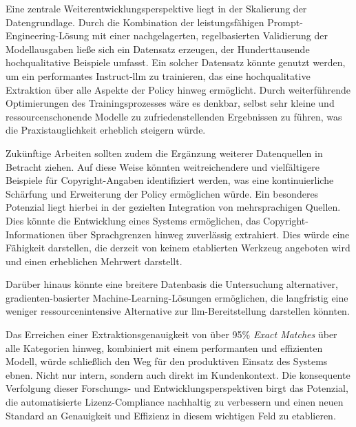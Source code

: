 Eine zentrale Weiterentwicklungsperspektive liegt in der Skalierung der Datengrundlage.
Durch die Kombination der leistungsfähigen Prompt-Engineering-Lösung mit einer nachgelagerten, regelbasierten Validierung der Modellausgaben ließe sich ein Datensatz erzeugen, der Hunderttausende hochqualitative Beispiele umfasst.
Ein solcher Datensatz könnte genutzt werden, um ein performantes Instruct-\gls{llm} zu trainieren, das eine hochqualitative Extraktion über alle Aspekte der Policy hinweg ermöglicht.
Durch weiterführende Optimierungen des Trainingsprozesses wäre es denkbar, selbst sehr kleine und ressourcenschonende Modelle zu zufriedenstellenden Ergebnissen zu führen, was die Praxistauglichkeit erheblich steigern würde.

Zukünftige Arbeiten sollten zudem die Ergänzung weiterer Datenquellen in Betracht ziehen.
Auf diese Weise könnten weitreichendere und vielfältigere Beispiele für Copyright-Angaben identifiziert werden, was eine kontinuierliche Schärfung und Erweiterung der Policy ermöglichen würde.
Ein besonderes Potenzial liegt hierbei in der gezielten Integration von mehrsprachigen Quellen.
Dies könnte die Entwicklung eines Systems ermöglichen, das Copyright-Informationen über Sprachgrenzen hinweg zuverlässig extrahiert.
Dies würde eine Fähigkeit darstellen, die derzeit von keinem etablierten Werkzeug angeboten wird und einen erheblichen Mehrwert darstellt.

Darüber hinaus könnte eine breitere Datenbasis die Untersuchung alternativer, gradienten-basierter Machine-Learning-Lösungen ermöglichen, die langfristig eine weniger ressourcenintensive Alternative zur \gls{llm}-Bereitstellung darstellen könnten.

Das Erreichen einer Extraktionsgenauigkeit von über \num{95}\% \textit{Exact Matches} über alle Kategorien hinweg, kombiniert mit einem performanten und effizienten Modell, würde schließlich den Weg für den produktiven Einsatz des Systems ebnen.
Nicht nur intern, sondern auch direkt im Kundenkontext.
Die konsequente Verfolgung dieser Forschungs- und Entwicklungsperspektiven birgt das Potenzial, die automatisierte Lizenz-Compliance nachhaltig zu verbessern und einen neuen Standard an Genauigkeit und Effizienz in diesem wichtigen Feld zu etablieren.